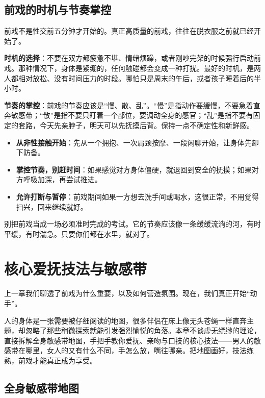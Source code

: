\documentclass[12pt,UTF8]{ctexbook}
\begin{document}
\section{前戏的时机与节奏掌控}

前戏不是性交前五分钟才开始的。真正高质量的前戏，往往在脱衣服之前就已经开始了。

\textbf{时机的选择}：不要在双方都疲惫不堪、情绪烦躁，或者刚吵完架的时候强行启动前戏。那种情况下，身体是紧绷的，任何触碰都会变成一种打扰。最好的时机，是两人都相对放松、没有时间压力的时段。哪怕只是周末的午后，或者孩子睡着后的半小时。

\textbf{节奏的掌控}：前戏的节奏应该是“慢、散、乱”。“慢”是指动作要缓慢，不要急着直奔敏感带；“散”是指不要只盯着一个部位，要调动全身的感官；“乱”是指不要有固定的套路，今天先亲脖子，明天可以先抚摸后背。保持一点不确定性和新鲜感。

\begin{itemize}
\item \textbf{从非性接触开始}：先从一个拥抱、一次肩颈按摩、一段闲聊开始，让身体先卸下防备。
\item \textbf{掌控节奏，别赶时间}：如果感觉对方身体僵硬，就退回到安全的抚摸；如果对方呼吸加深，再尝试推进。
\item \textbf{允许打断与暂停}：前戏期间如果一方想去洗手间或喝水，这很正常，不用觉得扫兴，回来继续就好。
\end{itemize}

\begin{tcolorbox}[colback=pink!5!white,colframe=red!50!black,title=贴心小叮咛]
别把前戏当成一场必须准时完成的考试。它的节奏应该像一条缓缓流淌的河，有时平缓，有时湍急。只要你们都在水里，就对了。
\end{tcolorbox}

\chapter{核心爱抚技法与敏感带}

上一章我们聊透了前戏为什么重要，以及如何营造氛围。现在，我们真正开始“动手”。

人的身体是一张需要被仔细阅读的地图，很多伴侣在床上像无头苍蝇一样直奔主题，却忽略了那些稍微探索就能引发强烈愉悦的角落。本章不谈虚无缥缈的理论，直接拆解全身敏感带地图，手把手教你爱抚、亲吻与口技的核心技法——男人的敏感带在哪里，女人的又有什么不同，手怎么放，嘴往哪亲。把地图画好，技法练熟，前戏才能真正成为享受。

\section{全身敏感带地图}
\end{document}
